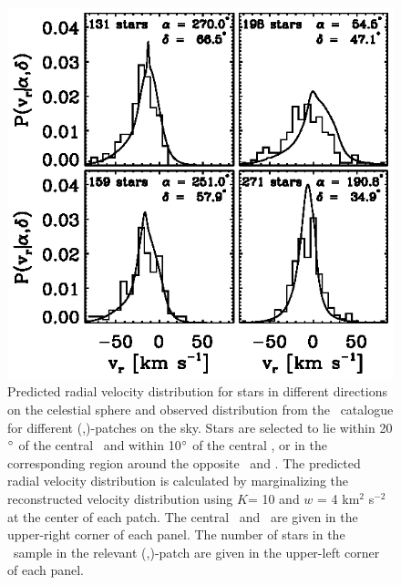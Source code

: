 \clearpage
\begin{figure}
\includegraphics{figs_veldist/radecpatches.ps}
\caption[Predicted radial velocity distribution for stars in different directions on the celestial sphere and observed distribution from the \gcsabb\ catalogue for different (\ra,\dec)-patches on the sky]{Predicted radial velocity distribution for stars in different directions on the celestial sphere and observed distribution from the \gcsabb\ catalogue for different (\ra,\dec)-patches on the sky. Stars are selected to lie within 20$^{\circ}$ of the central \ra\ and within 10$^{\circ}$ of the central \dec, or in the corresponding region around the opposite \ra\ and \dec. The predicted radial velocity distribution is calculated by marginalizing the reconstructed velocity distribution using $K$= 10 and $w$ = 4 km$^2$ s$^{-2}$ at the center of each patch. The central \ra\ and \dec\ are given in the upper-right corner of each panel. The number of stars in the \gcsabb\ sample in the relevant (\ra,\dec)-patch are given in the upper-left corner of each panel.}%
\label{fig:radecpatches}
\end{figure}


